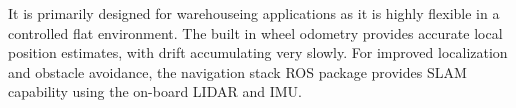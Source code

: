 \documentclass[times, utf8, diplomski, english]{fer}
\begin{document}
It is primarily designed for warehouseing applications as it is highly flexible in a controlled flat environment.
The built in wheel odometry provides accurate local position estimates, with drift accumulating very slowly.
For improved localization and obstacle avoidance, the navigation stack ROS package provides SLAM capability using the on-board LIDAR and IMU.
\end{document}
